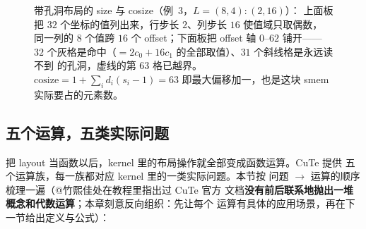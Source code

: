 \begin{figure}[H]
\caption{带孔洞布局的 size 与 cosize（例~3，$L=(8,4){:}(2,16)$）：
上面板把 $32$ 个坐标的值列出来，行步长 $2$、列步长 $16$ 使值域只取偶数，
同一列的 8 个值跨 $16$ 个 offset；下面板把 offset 轴 $0$–$62$ 铺开——
$32$ 个灰格是命中（$=2c_0+16c_1$ 的全部取值）、$31$ 个斜线格是永远读不到
的孔洞，虚线的第 $63$ 格已越界。$\mathrm{cosize}=1+\sum_i d_i(s_i-1)=63$
即最大偏移加一，也是这块 smem 实际要占的元素数。}
\label{fig:20-hole-size-cosize}
\end{figure}

\subsection{五个运算，五类实际问题}

把 layout 当函数以后，kernel 里的布局操作就全部变成函数运算。CuTe 提供
五个运算族，每一族都对应 kernel 里的一类实际问题。本节按
问题 $\to$ 运算的顺序梳理一遍（@竹熙佳处在教程里指出过 CuTe 官方
文档\textbf{没有前后联系地抛出一堆概念和代数运算}；本章刻意反向组织：先让每个
运算有具体的应用场景，再在下一节给出定义与公式）：

